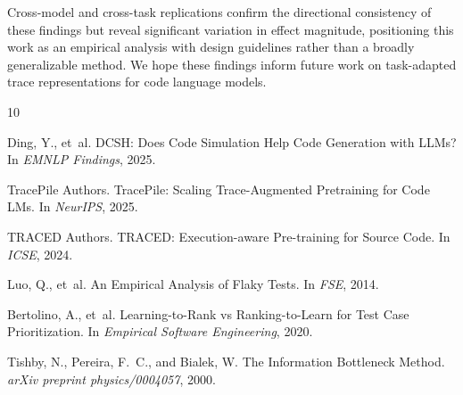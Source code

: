 \documentclass[11pt]{article}
\begin{document}
Cross-model and cross-task replications confirm the directional consistency of these findings but reveal significant variation in effect magnitude, positioning this work as an empirical analysis with design guidelines rather than a broadly generalizable method. We hope these findings inform future work on task-adapted trace representations for code language models.



\begin{thebibliography}{10}

Ding, Y., et~al.
\newblock DCSH: Does Code Simulation Help Code Generation with LLMs?
\newblock In \emph{EMNLP Findings}, 2025.

TracePile Authors.
\newblock TracePile: Scaling Trace-Augmented Pretraining for Code LMs.
\newblock In \emph{NeurIPS}, 2025.

TRACED Authors.
\newblock TRACED: Execution-aware Pre-training for Source Code.
\newblock In \emph{ICSE}, 2024.

Luo, Q., et~al.
\newblock An Empirical Analysis of Flaky Tests.
\newblock In \emph{FSE}, 2014.

Bertolino, A., et~al.
\newblock Learning-to-Rank vs Ranking-to-Learn for Test Case Prioritization.
\newblock In \emph{Empirical Software Engineering}, 2020.

Tishby, N., Pereira, F.~C., and Bialek, W.
\newblock The Information Bottleneck Method.
\newblock \emph{arXiv preprint physics/0004057}, 2000.

\end{thebibliography}
\end{document}
